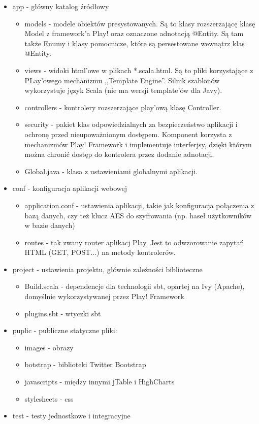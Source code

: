 \documentclass[a4paper,12pt,notitlepage]{mwrep}
\begin{document}
\begin{itemize}
	\item	app - główny katalog źródłowy	
		\begin{itemize}
			\item	models - modele obiektów presystowanych. Są to klasy rozszerzającę klasę Model z framework'a
				Play! oraz oznaczone adnotacją @Entity. Są tam także Enumy i klasy pomocnicze, które są 
				persestowane wewnątrz klas @Entity.
			\item	views - widoki html'owe w plikach *.scala.html. Są to pliki korzystające z PLay'owego mechanizmu 
				,,Template Engine''. Silnik szablonów wykorzystuje język Scala (nie ma wersji template'ów dla Javy).
			\item	controllers - kontrolery rozszerzające play'ową klasę Controller.
			\item	security - pakiet klas odpowiedzialnych za bezpieczeństwo aplikacji i ochronę przed 
				nieupoważnionym dostępem. Komponent korzysta z mechanizmów Play! Framework i implementuje interferjsy, 
				dzięki którym można chronić dostęp do kontrolera przez dodanie adnotacji.
			\item	Global.java - klasa z ustawieniami globalnymi aplikacji.	
		\end{itemize}
	\item	conf - konfiguracja aplikacji webowej
		\begin{itemize}
			\item	application.conf - ustawienia aplikacji, takie jak konfiguracja połączenia z bazą danych, 
				czy też klucz AES do szyfrowania (np. haseł użytkowników w bazie danych)
			\item	routes - tak zwany router aplikacj Play. Jest to odwzorowanie zapytań HTML (GET, POST...) 
				na metody kontrolerów.		
		\end{itemize}
	\item	project - ustawienia projektu, głównie zależności biblioteczne
		\begin{itemize}
			\item	Build.scala - dependencje dla technologii sbt, opartej na Ivy (Apache), domyślnie wykorzystywanej 
				przez Play! Framework
			\item	plugins.sbt - wtyczki sbt
		\end{itemize}
	\item	puplic - publiczne statyczne pliki:
		\begin{itemize}
			\item	images - obrazy
			\item	botstrap - biblioteki Twitter Bootstrap
			\item	javascripts - między innymi jTable i HighCharts
			\item	stylesheets - css
		\end{itemize}
	\item	test - testy jednostkowe i integracyjne
\end{itemize}
\end{document}
